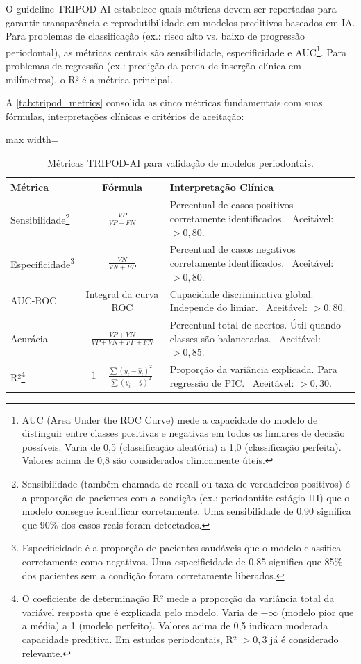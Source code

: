 O guideline TRIPOD-AI estabelece quais métricas devem ser reportadas
para garantir transparência e reprodutibilidade em modelos preditivos
baseados em IA. Para problemas de classificação (ex.: risco alto vs.
baixo de progressão periodontal), as métricas centrais são
sensibilidade, especificidade e AUC\footnote{AUC (Area Under the ROC
Curve) mede a capacidade do modelo de distinguir entre classes
positivas e negativas em todos os limiares de decisão possíveis.
Varia de 0,5 (classificação aleatória) a 1,0 (classificação perfeita).
Valores acima de 0,8 são considerados clinicamente úteis.}. Para
problemas de regressão (ex.: predição da perda de inserção clínica em
milímetros), o R² é a métrica principal.

A \autoref{tab:tripod_metrics} consolida as cinco métricas
fundamentais com suas fórmulas, interpretações clínicas e critérios
de aceitação:

\begin{table}[htb]
\centering
\caption{Métricas TRIPOD-AI para validação de modelos periodontais.}
\label{tab:tripod_metrics}
\begin{adjustbox}{max width=\textwidth}
\begin{tabular}{lcl}
\toprule
\textbf{Métrica} & \textbf{Fórmula} & \textbf{Interpretação Clínica} \\
\midrule
Sensibilidade\footnote{Sensibilidade (também chamada de recall ou
taxa de verdadeiros positivos) é a proporção de pacientes com a
condição (ex.: periodontite estágio III) que o modelo consegue
identificar corretamente. Uma sensibilidade de 0,90 significa que
90\% dos casos reais foram detectados.}
& $\displaystyle \frac{VP}{VP + FN}$
& Percentual de casos positivos corretamente identificados.
\, Aceitável: $> 0{,}80$. \\
Especificidade\footnote{Especificidade é a proporção de pacientes
saudáveis que o modelo classifica corretamente como negativos. Uma
especificidade de 0,85 significa que 85\% dos pacientes sem a
condição foram corretamente liberados.}
& $\displaystyle \frac{VN}{VN + FP}$
& Percentual de casos negativos corretamente identificados.
\, Aceitável: $> 0{,}80$. \\
AUC-ROC & Integral da curva ROC &
Capacidade discriminativa global. Independe do limiar.
\, Aceitável: $> 0{,}80$. \\
Acurácia & $\displaystyle \frac{VP + VN}{VP + VN + FP + FN}$ &
Percentual total de acertos. Útil quando classes são balanceadas.
\, Aceitável: $> 0{,}85$. \\
R²\footnote{O coeficiente de determinação R² mede a proporção da
variância total da variável resposta que é explicada pelo modelo.
Varia de $-\infty$ (modelo pior que a média) a 1 (modelo perfeito).
Valores acima de 0,5 indicam moderada capacidade preditiva. Em
estudos periodontais, R² $> 0{,}3$ já é considerado relevante.}
& $\displaystyle 1 - \frac{\sum (y_i - \hat{y}_i)^2}{\sum (y_i - \bar{y})^2}$ &
Proporção da variância explicada. Para regressão de PIC.
\, Aceitável: $> 0{,}30$. \\
\bottomrule
\end{tabular}
\end{adjustbox}
\end{table}

